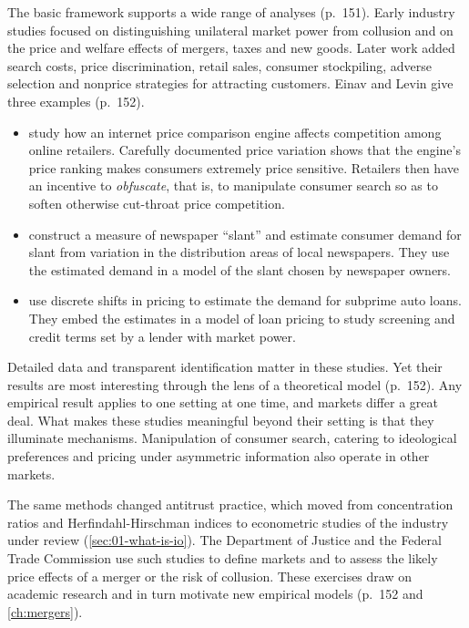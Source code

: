 The basic framework supports a wide range of analyses (p.~151). Early industry studies focused on
distinguishing unilateral market power from collusion and on the price and welfare effects of mergers, taxes
and new goods. Later work added search costs, price discrimination, retail sales, consumer stockpiling,
adverse selection and nonprice strategies for attracting customers. Einav and Levin give three examples
(p.~152).
\begin{itemize}
  \item \citet{EllisonEllison2009} study how an internet price comparison engine affects competition among
        online retailers. Carefully documented price variation shows that the engine's price ranking makes
        consumers extremely price sensitive. Retailers then have an incentive to \emph{obfuscate}, that is,
        to manipulate consumer search so as to soften otherwise cut-throat price competition.
  \item \citet{GentzkowShapiro2010} construct a measure of newspaper ``slant'' and estimate consumer demand
        for slant from variation in the distribution areas of local newspapers. They use the estimated demand
        in a model of the slant chosen by newspaper owners.
  \item \citet{EinavJenkinsLevin2012} use discrete shifts in pricing to estimate the demand for subprime auto
        loans. They embed the estimates in a model of loan pricing to study screening and credit terms set
        by a lender with market power.
\end{itemize}
Detailed data and transparent identification matter in these studies. Yet their results are most interesting
through the lens of a theoretical model (p.~152). Any empirical result applies to one setting at one time,
and markets differ a great deal. What makes these studies meaningful beyond their setting is that they
illuminate mechanisms. Manipulation of consumer search, catering to ideological preferences and pricing under
asymmetric information also operate in other markets.

The same methods changed antitrust practice, which moved from concentration ratios and Herfindahl-Hirschman
indices to econometric studies of the industry under review (\cref{sec:01-what-is-io}). The Department of
Justice and the Federal Trade Commission use such studies to define markets and to assess the likely price
effects of a merger or the risk of collusion. These exercises draw on academic research and in turn motivate
new empirical models (p.~152 and \cref{ch:mergers}).

